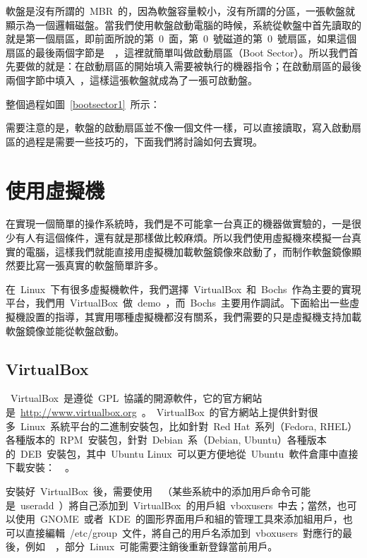 軟盤是沒有所謂的~MBR~的，因為軟盤容量較小，沒有所謂的分區，一張軟盤就顯示為一個邏輯磁盤。當我們使用軟盤啟動電腦的時候，系統從軟盤中首先讀取的就是第一個扇區，即前面所說的第~0~面，第~0~號磁道的第~0~號扇區，如果這個扇區的最後兩個字節是~~，這裡就簡單叫做啟動扇區（Boot Sector）。所以我們首先要做的就是：在啟動扇區的開始填入需要被執行的機器指令；在啟動扇區的最後兩個字節中填入~，這樣這張軟盤就成為了一張可啟動盤。


整個過程如圖~\ref{bootsector1}~所示：


需要注意的是，軟盤的啟動扇區並不像一個文件一樣，可以直接讀取，寫入啟動扇區的過程是需要一些技巧的，下面我們將討論如何去實現。

\section{使用虛擬機}

在實現一個簡單的操作系統時，我們是不可能拿一台真正的機器做實驗的，一是很少有人有這個條件，還有就是那樣做比較麻煩。所以我們使用虛擬機來模擬一台真實的電腦，這樣我們就能直接用虛擬機加載軟盤鏡像來啟動了，而制作軟盤鏡像顯然要比寫一張真實的軟盤簡單許多。

在~Linux~下有很多虛擬機軟件，我們選擇~VirtualBox~和~Bochs~作為主要的實現平台，我們用~VirtualBox~做~demo~，而~Bochs~主要用作調試。下面給出一些虛擬機設置的指導，其實用哪種虛擬機都沒有關系，我們需要的只是虛擬機支持加載軟盤鏡像並能從軟盤啟動。

\subsection{VirtualBox}

~VirtualBox~是遵從~GPL~協議的開源軟件，它的官方網站是~\url{http://www.virtualbox.org}~。~VirtualBox~的官方網站上提供針對很多~Linux~系統平台的二進制安裝包，比如針對~Red Hat~系列（Fedora, RHEL）各種版本的~RPM~安裝包，針對~Debian~系（Debian, Ubuntu）各種版本的~DEB~安裝包，其中~Ubuntu
Linux~可以更方便地從~Ubuntu~軟件倉庫中直接下載安裝：~~。

安裝好~VirtualBox~後，需要使用~~（某些系統中的添加用戶命令可能是~useradd~）將自己添加到~VirtualBox~的用戶組~vboxusers~中去；當然，也可以使用~GNOME~或者~KDE~的圖形界面用戶和組的管理工具來添加組用戶，也可以直接編輯~/etc/group~文件，將自己的用戶名添加到~vboxusers~對應行的最後，例如~~，部分~Linux~可能需要注銷後重新登錄當前用戶。

